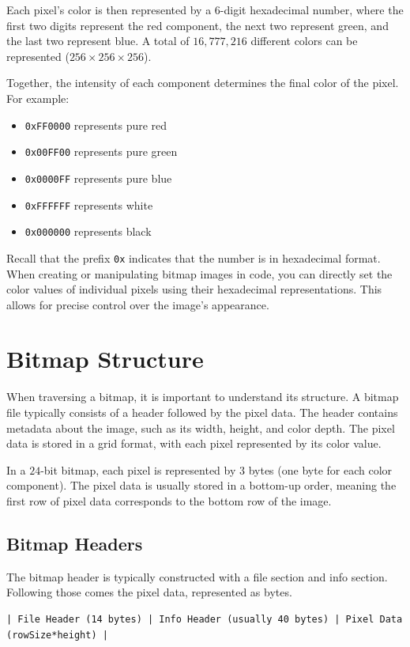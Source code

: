 Each pixel's color is then represented by a 6-digit hexadecimal number, where the first two digits represent the red component, the next two represent green, and the last two represent blue.  A total of $16,777,216$ different colors can be represented ($256 \times 256 \times 256$).


Together, the intensity of each component determines the final color of the pixel. For example:
\begin{itemize}
\item \texttt{0xFF0000} represents pure red
\item \texttt{0x00FF00} represents pure green
\item \texttt{0x0000FF} represents pure blue
\item \texttt{0xFFFFFF} represents white
\item \texttt{0x000000} represents black
\end{itemize}

Recall that the prefix \texttt{0x} indicates that the number is in hexadecimal format.
When creating or manipulating bitmap images in code, you can directly set the color values of individual pixels using their hexadecimal representations. This allows for precise control over the image's appearance.

\section{Bitmap Structure}
When traversing a bitmap, it is important to understand its structure. A bitmap file typically consists of a header followed by the pixel data. The header contains metadata about the image, such as its width, height, and color depth. The pixel data is stored in a grid format, with each pixel represented by its color value.

In a $24$-bit bitmap, each pixel is represented by $3$ bytes (one byte for each color component). The pixel data is usually stored in a bottom-up order, meaning the first row of pixel data corresponds to the bottom row of the image.

\subsection{Bitmap Headers}
The bitmap header is typically constructed with a file section and info section. Following those comes the pixel data, represented as bytes.
\begin{verbatim}
| File Header (14 bytes) | Info Header (usually 40 bytes) | Pixel Data (rowSize*height) |
\end{verbatim}

